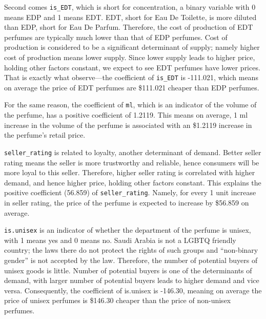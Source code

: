 \documentclass[12pt]{amsart}
\begin{document}
Second comes \texttt{is\_EDT}, which is short for concentration, a binary variable with 0 means 
EDP and 1 means EDT. EDT, short for Eau De Toilette, is more diluted than EDP, short for Eau 
De Parfum. Therefore, the cost of production of EDT perfumes are typically much lower than 
that of EDP perfumes. Cost of production is considered to be a significant determinant of supply; 
namely higher cost of production means lower supply. Since lower supply leads to higher price, 
holding other factors constant, we expect to see EDT perfumes have lower prices. That is exactly 
what observe—the coefficient of \texttt{is\_EDT} is -111.021, which means on average the price of 
EDT perfumes are \$111.021 cheaper than EDP perfumes.

For the same reason, the coefficient of \texttt{ml}, which is an indicator of the volume of the 
perfume, has a positive coefficient of 1.2119. This means on average, 1 ml increase in the 
volume of the perfume is associated with an \$1.2119 increase in the perfume’s retail price.

\texttt{seller\_rating} is related to loyalty, another determinant of demand. Better seller rating 
means the seller is more trustworthy and reliable, hence consumers will be more loyal to this 
seller. Therefore, higher seller rating is correlated with higher demand, and hence higher price, 
holding other factors constant. This explains the positive coefficient (56.859) of \texttt{seller\_rating}. 
Namely, for every 1 unit increase in seller rating, the price of the perfume is expected to increase 
by \$56.859 on average.

\texttt{is.unisex} is an indicator of whether the department of the perfume is unisex, with 1 
means yes and 0 means no. Saudi Arabia is not a LGBTQ friendly country; the laws there do not 
protect the rights of such groups and “non-binary gender” is not accepted by the law. Therefore, the number of potential buyers of unisex goods is little. Number of 
potential buyers is one of the determinants of demand, with larger number of potential buyers 
leads to higher demand and vice versa. Consequently, the coefficient of is.unisex is -146.30, 
meaning on average the price of unisex perfumes is \$146.30 cheaper than the price of non-unisex 
perfumes.
\end{document}
